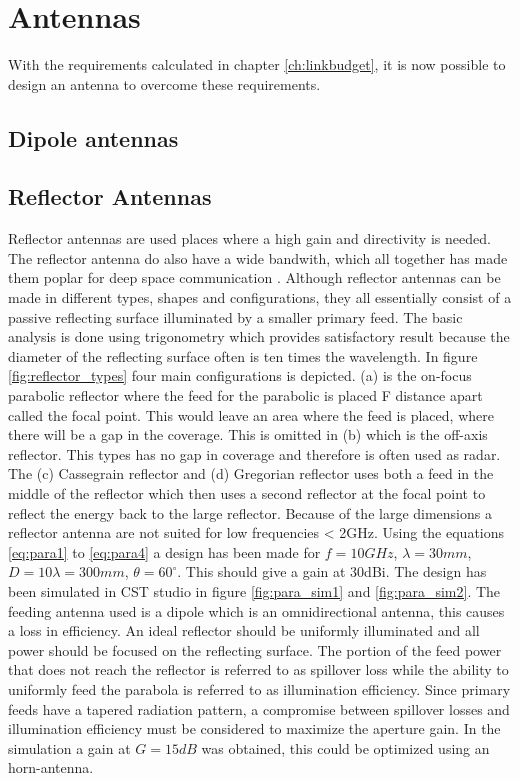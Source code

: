 \chapter{Antennas}\label{ch:antennas}

With the requirements calculated in chapter \ref{ch:linkbudget}, it is now possible to design an antenna to overcome these requirements.  

\section{Dipole antennas}


\section{Reflector Antennas}

Reflector antennas are used places where a high gain and directivity is needed. The reflector antenna do also have a wide bandwith, which all together has made them poplar for deep space communication \citep{Imbriale2012}. Although reflector antennas can be made in different types, shapes and configurations, they all essentially consist of a passive reflecting surface illuminated by a smaller primary feed. The basic analysis is done using trigonometry which provides satisfactory result because the diameter of the reflecting surface often is ten times the wavelength. In figure \ref{fig:reflector_types} four main configurations is depicted. (a) is the on-focus parabolic reflector where the feed for the parabolic is placed F distance apart called the focal point. This would leave an area where the feed is placed, where there will be a gap in the coverage. This is omitted in (b) which is the off-axis reflector. This types has no gap in coverage and therefore is often used as radar. The (c) Cassegrain reflector and (d) Gregorian reflector uses both a feed in the middle of the reflector which then uses a second reflector at the focal point to reflect the energy back to the large reflector. Because of the large dimensions a reflector antenna are not suited for low frequencies < 2GHz. Using the equations \ref{eq:para1} to \ref{eq:para4} a design has been made for $f = 10GHz$, $\lambda = 30mm$, $D = 10\lambda = 300mm$, $\theta = 60^{\circ}$. This should give a gain at 30dBi. The design has been simulated in CST studio in figure \ref{fig:para_sim1} and \ref{fig:para_sim2}. The feeding antenna used is a dipole which is an omnidirectional antenna, this causes a loss in efficiency. An ideal reflector should be uniformly illuminated and all power should
be focused on the reflecting surface. The portion of the feed power that does not reach the reflector is referred to
as spillover loss while the ability to uniformly feed the parabola is referred to as illumination efficiency. Since
primary feeds have a tapered radiation pattern, a compromise between spillover losses and illumination
efficiency must be considered to maximize the aperture gain. In the simulation a gain at $G=15dB$ was obtained, this could be optimized using an horn-antenna. 

